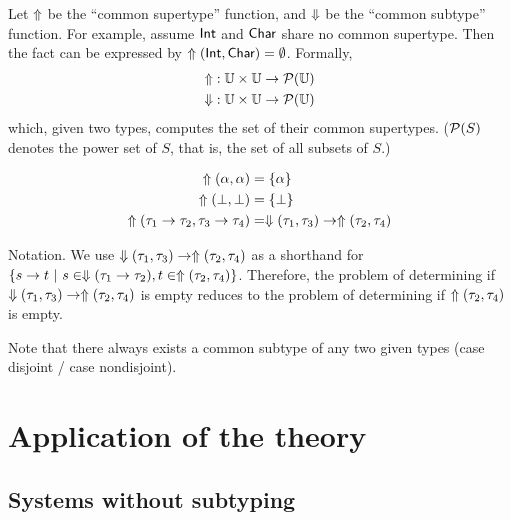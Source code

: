 \documentclass[nocopyrightspace,preprint,times,9pt]{sigplanconf}
\begin{document}
Let $\Uparrow$ be the ``common supertype'' function, and $\Downarrow$ be the ``common subtype'' function. For example, assume $\textsf{Int}$ and $\textsf{Char}$ share no common supertype. Then the fact can be expressed by $\Uparrow(\textsf{Int},\textsf{Char})=\emptyset$. Formally,
\begin{align*}
  \Uparrow &: \mathbb{U} \times \mathbb{U} \to \mathcal{P}(\mathbb{U}) \\
  \Downarrow   &: \mathbb{U} \times \mathbb{U} \to \mathcal{P}(\mathbb{U})
\end{align*}
which, given two types, computes the set of their common supertypes. ($\mathcal{P}(S)$ denotes the power set of $S$, that is, the set of all subsets of $S$.)

\begin{align*}
  \Uparrow(\alpha,\alpha) &= \{ \alpha \} \\
  \Uparrow(\bot,\bot) &= \{ \bot \} \\
  \Uparrow(\tau_1 \to \tau_2, \tau_3 \to \tau_4) &= \Downarrow(\tau_1,\tau_3) \to \Uparrow(\tau_2,\tau_4) \\
\end{align*}

Notation. We use $\Downarrow(\tau_1,\tau_3) \to \Uparrow(\tau_2,\tau_4)$ as a shorthand for $\{ s \to t ~|~ s \in \Downarrow(\tau_1 \to \tau_2), t \in \Uparrow(\tau_2,\tau_4) \}$. Therefore, the problem of determining if $\Downarrow(\tau_1,\tau_3) \to \Uparrow(\tau_2,\tau_4)$ is empty reduces to the problem of determining if $\Uparrow(\tau_2,\tau_4)$ is empty.

Note that there always exists a common subtype of any two given types (case disjoint / case nondisjoint).



\section{Application of the theory}

\subsection{Systems without subtyping}
\end{document}
